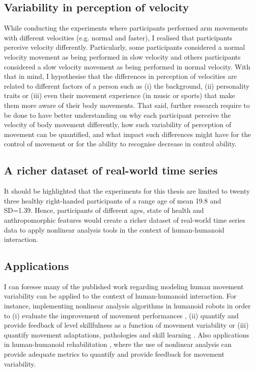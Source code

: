 \subsection*{Variability in perception of velocity}
While conducting the experiments where participants performed 
arm movements with different velocities (e.g. normal and faster), 
I realised that participants perceive velocity differently.
Particularly, some participants considered a normal velocity movement 
as being performed in slow velocity and others participants considered 
a slow velocity movement as being performed in normal velocity. 
With that in mind, I hypothesise that the differences in perception 
of velocities are related to different factors of a person such as 
(i) the background, 
(ii) personality traits or
(iii) even their movement experience 
(in music or sports) that make them more aware of their body movements. 
That said, further research require to be done to have better 
understanding on why each participant perceive the velocity of 
body movement differently, how such variability of perception 
of movement can be quantified, and 
what impact such differences might have for the control of 
movement or for the ability to recognise decrease in control
ability. 

\subsection*{A richer dataset of real-world time series}
It should be highlighted that the experiments for this thesis are 
limited to twenty three healthy right-handed participants of a 
range age of mean 19.8 and SD=1.39.
Hence, participants of different ages, state of health and 
anthropomorphic features would create a richer dataset of 
real-world time series data to apply nonlinear analysis tools 
in the context of human-humanoid interaction. 

\subsection*{Applications}
I can foresee many of the published work regarding modeling human movement 
variability can be applied to the context of human-humanoid interaction.
For instance, implementing nonlinear analysis algorithms in humanoid robots 
in order to 
(i) evaluate the improvement of movement performances \citep{muller2004}, 
(ii) quantify and provide feedback of level skillfulness as a function 
of movement variability \citep{seifert2011} or 
(iii) quantify movement adaptations, pathologies and skill learning 
\citep{preatoni2007, preatoni2010, preatoni2013}.
Also applications in human-humanoid rehabilitation 
\citep{gorer2013, guneysu2015}, 
where the use of nonlinear analysis can provide adequate 
metrics to quantify and provide feedback for movement variability. 

